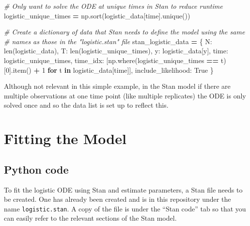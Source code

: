 \documentclass[
  12pt,
]{article}
\newenvironment{Shaded}{\begin{snugshade}}{\end{snugshade}}
\newcommand{\BuiltInTok}[1]{#1}
\newcommand{\CommentTok}[1]{\textcolor[rgb]{0.56,0.35,0.01}{\textit{#1}}}
\newcommand{\ControlFlowTok}[1]{\textcolor[rgb]{0.13,0.29,0.53}{\textbf{#1}}}
\newcommand{\DecValTok}[1]{\textcolor[rgb]{0.00,0.00,0.81}{#1}}
\newcommand{\KeywordTok}[1]{\textcolor[rgb]{0.13,0.29,0.53}{\textbf{#1}}}
\newcommand{\NormalTok}[1]{#1}
\newcommand{\OperatorTok}[1]{\textcolor[rgb]{0.81,0.36,0.00}{\textbf{#1}}}
\newcommand{\StringTok}[1]{\textcolor[rgb]{0.31,0.60,0.02}{#1}}
\newcommand{\VariableTok}[1]{\textcolor[rgb]{0.00,0.00,0.00}{#1}}
\begin{document}
\begin{Shaded}
\begin{Highlighting}[]
\CommentTok{\# Only want to solve the ODE at unique times in Stan to reduce runtime}
\NormalTok{logistic\_unique\_times }\OperatorTok{=}\NormalTok{ np.sort(logistic\_data[}\StringTok{\textquotesingle{}time\textquotesingle{}}\NormalTok{].unique())}

\CommentTok{\# Create a dictionary of data that Stan needs to define the model using the same}
\CommentTok{\# names as those in the "logistic.stan" file}
\NormalTok{stan\_logistic\_data }\OperatorTok{=}\NormalTok{ \{}
    \StringTok{\textquotesingle{}N\textquotesingle{}}\NormalTok{: }\BuiltInTok{len}\NormalTok{(logistic\_data),}
    \StringTok{\textquotesingle{}T\textquotesingle{}}\NormalTok{: }\BuiltInTok{len}\NormalTok{(logistic\_unique\_times),}
    \StringTok{\textquotesingle{}y\textquotesingle{}}\NormalTok{: logistic\_data[}\StringTok{\textquotesingle{}y\textquotesingle{}}\NormalTok{],}
    \StringTok{\textquotesingle{}time\textquotesingle{}}\NormalTok{: logistic\_unique\_times,}
    \StringTok{\textquotesingle{}time\_idx\textquotesingle{}}\NormalTok{: [np.where(logistic\_unique\_times }\OperatorTok{==}\NormalTok{ t)[}\DecValTok{0}\NormalTok{].item() }\OperatorTok{+} \DecValTok{1} \ControlFlowTok{for}\NormalTok{ t }\KeywordTok{in}\NormalTok{ logistic\_data[}\StringTok{\textquotesingle{}time\textquotesingle{}}\NormalTok{]],}
    \StringTok{\textquotesingle{}include\_likelihood\textquotesingle{}}\NormalTok{: }\VariableTok{True}
\NormalTok{\}}
\end{Highlighting}
\end{Shaded}

Although not relevant in this simple example, in the Stan model if there
are multiple observations at one time point (like multiple replicates)
the ODE is only solved once and so the data list is set up to reflect
this.

\section{Fitting the Model}\label{fitting-the-model}

\subsection{Python code}\label{python-code}

To fit the logistic ODE using Stan and estimate parameters, a Stan file
needs to be created. One has already been created and is in this
repository under the name \texttt{logistic.stan}. A copy of the file is
under the ``Stan code'' tab so that you can easily refer to the relevant
sections of the Stan model.
\end{document}
